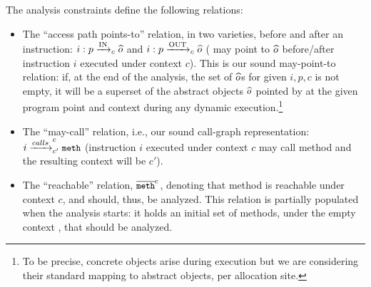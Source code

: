 \noindent The analysis constraints define the following relations:

\begin{itemize}
\item The ``access path points-to'' relation, in two varieties, before
  and after an instruction: \({{i}: {p} \xrightarrow{\text{IN}}_{c} {\widehat{o}}}\) and
  \({{i}: {p} \xrightarrow{\text{OUT}}_{c} {\widehat{o}}}\) ( may point to \({\widehat{o}}\)
  before/after instruction \(i\) executed under context \(c\)). This
  is our sound may-point-to relation: if, at the end of the analysis,
  the set of \({\widehat{o}}\)s for given \(i,p,c\) is not empty, it will
  be a superset of the abstract objects \({\widehat{o}}\) pointed by
   at the given program point and context during any dynamic
  execution.\footnote{To be precise, concrete objects arise during
    execution but we are considering their standard mapping to abstract
    objects, per allocation site.}

\item The ``may-call'' relation, i.e., our sound call-graph representation:
  \({i} \xrightarrow{calls}^{c}_{c'} {{\small {\texttt{meth}}}}\) (instruction \(i\) executed under context
  \(c\) may call method  and the resulting context will be \(c'\)).

\item The ``reachable'' relation, \({\overline{{{\small {\texttt{meth}}}}}^{\text{c}}}\),
  denoting that method  is reachable under context \(c\),
  and should, thus, be analyzed. This relation is partially populated
  when the analysis starts: it holds an initial set of methods, under
  the empty context , that should be analyzed.

\end{itemize}







